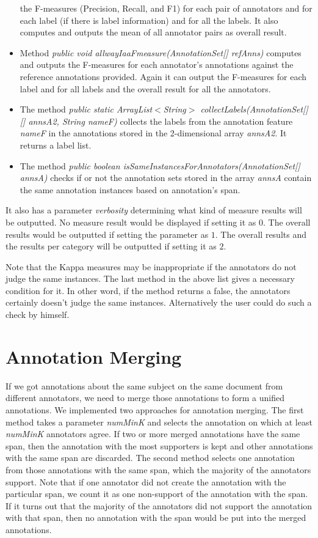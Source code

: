 \begin{itemize}
the F-measures (Precision, 
Recall, and F1) for each pair of annotators and for each label (if there is label 
information) and for all the labels. It also computes and outputs the mean of all 
annotator pairs as overall result.
\item Method {\em public void allwayIaaFmeasure(AnnotationSet[] refAnns)} computes and outputs the
F-measures for each annotator's annotations against the reference annotations provided. Again it
can output the F-measures for each label and for all labels and the overall result for all the
annotators.
\item The method {\em public static ArrayList$<$String$>$ collectLabels(AnnotationSet[][] annsA2,
    String nameF)} collects the labels from the annotation feature {\em nameF} in the 
   annotations stored in the 2-dimensional array {\em annsA2}. It returns a label list.
\item The method {\em public boolean isSameInstancesForAnnotators(AnnotationSet[] annsA)} checks
if or not the annotation sets stored in the array {\em annsA} contain the same 
annotation instances based on annotation's span.
\end{itemize}

It also has a parameter {\em verbosity} determining what kind of measure results will
be outputted. No measure result would be displayed if setting it as $0$. The overall results 
would be outputted if setting the parameter as $1$.  The overall results and the results per
category will be outputted if setting it as $2$.

Note that the Kappa measures may be inappropriate if the annotators do not judge the same
instances. The last method in the above list gives a necessary condition for it. In other word,
if the method returns a false, the annotators certainly doesn't judge the same instances. 
Alternatively the user could do such a check by himself.

\section{Annotation Merging}

If we got annotations about the same subject on the same document from different
annotators, we need to merge those annotations to form a unified annotations. We 
implemented two approaches for annotation merging.
The first method takes a parameter {\em numMinK} and selects the annotation
on which at least {\em numMinK} annotators agree. If two or more merged annotations have the
same span, then the annotation with the most supporters is kept and other 
annotations with the same span are discarded.
The second method selects one annotation from those annotations with the same span, 
which the majority of the annotators support. Note that if one annotator did not create
the annotation with the particular span, we count it as one non-support of the annotation 
with the span. If it turns out that the majority of the annotators did not support the
 annotation with that span, then no annotation with the span would be put into the
merged annotations.


